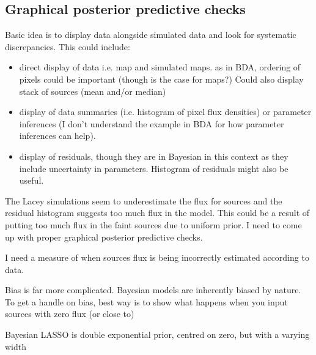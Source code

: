 \documentclass[a4paper,11pt]{article}
\begin{document}
\subsection{Graphical posterior predictive checks}
Basic idea is to display data alongside simulated data and look for systematic discrepancies. This could include:
\begin{itemize}
\item direct display of data i.e. map and simulated maps. as in BDA, ordering of pixels could be important (though is the case for maps?) Could also display stack of sources (mean and/or median)
\item display of data summaries (i.e. histogram of pixel flux densities) or parameter inferences (I don't understand the example in BDA for how parameter inferences can help).
\item display of residuals, though they are in Bayesian in this context as they include uncertainty in parameters. Histogram of residuals might also be useful.
\end{itemize}

The Lacey simulations seem to underestimate the flux for sources and the residual histogram suggests too much flux in the model. This could be a result of putting too much flux in the faint sources due to uniform prior. I need to come up with proper graphical posterior predictive checks. 


I need a measure of when sources flux is being incorrectly estimated according to data. 

Bias is far more complicated. Bayesian models are inherently biased by nature. To get a handle on bias, best way is to show what happens when you input sources with zero flux (or close to) 

Bayesian LASSO is double exponential prior, centred on zero, but with a varying width
\end{document}
